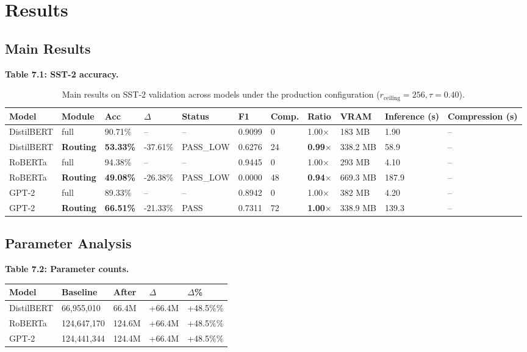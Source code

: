 
\section{Results}

\subsection{Main Results}

\textbf{Table 7.1: SST-2 accuracy.}

\begin{table}[t]
\centering
\small
\begin{tabular}{lllllllllll}
\toprule
\textbf{Model} & \textbf{Module} & \textbf{Acc} & \textbf{$\Delta$} & \textbf{Status} & \textbf{F1} & \textbf{Comp.} & \textbf{Ratio} & \textbf{VRAM} & \textbf{Inference (s)} & \textbf{Compression (s)} \\
\midrule
DistilBERT & full & 90.71\% & -- & -- & 0.9099 & 0 & 1.00$\times$ & 183 MB & 1.90 & -- \\
DistilBERT & \textbf{Routing} & \textbf{53.33\%} & -37.61\% & PASS\_LOW & 0.6276 & 24 & \textbf{0.99$\times$} & 338.2 MB & 58.9 & -- \\
RoBERTa & full & 94.38\% & -- & -- & 0.9445 & 0 & 1.00$\times$ & 293 MB & 4.10 & -- \\
RoBERTa & \textbf{Routing} & \textbf{49.08\%} & -26.38\% & PASS\_LOW & 0.0000 & 48 & \textbf{0.94$\times$} & 669.3 MB & 187.9 & -- \\
GPT-2 & full & 89.33\% & -- & -- & 0.8942 & 0 & 1.00$\times$ & 382 MB & 4.20 & -- \\
GPT-2 & \textbf{Routing} & \textbf{66.51\%} & -21.33\% & PASS & 0.7311 & 72 & \textbf{1.00$\times$} & 338.9 MB & 139.3 & -- \\
\bottomrule
\end{tabular}
\caption{Main results on SST-2 validation across models under the production configuration ($r_{\mathrm{ceiling}}=256, \tau=0.40$).}
\label{tab:main_sst2}
\end{table}

\subsection{Parameter Analysis}

\textbf{Table 7.2: Parameter counts.}

\begin{table}[H]
\centering
\small
\begin{tabular}{lllll}
\toprule
\textbf{Model} & \textbf{Baseline} & \textbf{After} & \textbf{$\Delta$} & \textbf{$\Delta$\%} \\
\midrule
DistilBERT & 66,955,010 & 66.4M & +66.4M & +48.5\%\% \\
RoBERTa & 124,647,170 & 124.6M & +66.4M & +48.5\%\% \\
GPT-2 & 124,441,344 & 124.4M & +66.4M & +48.5\%\% \\
\bottomrule
\end{tabular}
\end{table}


